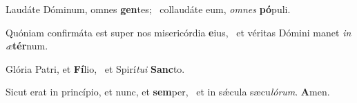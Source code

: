 \item Laudáte Dóminum, omnes \textbf{gen}tes;~\psstar{} collaudáte eum, \textit{omnes} \textbf{pó}puli.

\item Quóniam confirmáta est super nos misericórdia \textbf{e}ius,~\psstar{} et véritas Dómini manet \textit{in} \textit{æ}\textbf{tér}num.

\item Glória Patri, et \textbf{Fí}lio,~\psstar{} et Spirí\textit{tui} \textbf{Sanc}to.

\item Sicut erat in princípio, et nunc, et \textbf{sem}per,~\psstar{} et in sǽcula sæcu\textit{lórum}. \textbf{A}men.